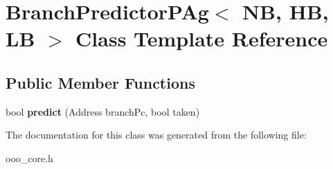 \hypertarget{classBranchPredictorPAg}{\section{Branch\-Predictor\-P\-Ag$<$ N\-B, H\-B, L\-B $>$ Class Template Reference}
\label{classBranchPredictorPAg}
}
\subsection*{Public Member Functions}
\begin{DoxyCompactItemize}
\item 
\hypertarget{classBranchPredictorPAg_a23a118b8dfac700a90fa7893a86a8268}{bool {\bfseries predict} (Address branch\-Pc, bool taken)}\label{classBranchPredictorPAg_a23a118b8dfac700a90fa7893a86a8268}

\end{DoxyCompactItemize}


The documentation for this class was generated from the following file\-:\begin{DoxyCompactItemize}
\item 
ooo\-\_\-core.\-h\end{DoxyCompactItemize}
